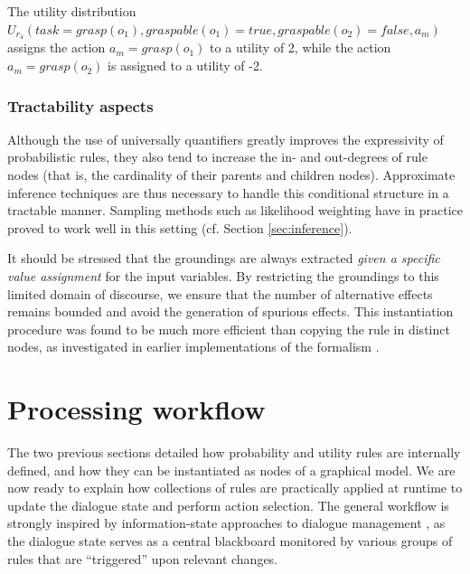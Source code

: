 The utility distribution $U_{r_4}(\mathit{task}\!=\!\mathit{grasp}(o_1), \mathit{graspable}(o_1) \!=\!\mathit{true}, \mathit{graspable}(o_2)\!=\!\mathit{false}, a_m)$ assigns the action $a_m\!=\!\mathit{grasp}(o_1)$ to a utility of 2, while the action $a_m\!=\!\mathit{grasp(o_2)}$ is assigned to a utility of -2. 

\subsubsection*{Tractability aspects}

Although the use of universally quantifiers greatly improves the expressivity of probabilistic rules, they also tend to increase the in- and out-degrees of rule nodes (that is, the cardinality of their parents and children nodes). Approximate inference techniques are thus necessary to handle this conditional structure in a tractable manner. Sampling methods such as likelihood weighting have in practice proved to work well in this setting (cf. Section \ref{sec:inference}).

It should be stressed that the groundings are always extracted \textit{given a specific value assignment} for the input variables. By restricting the groundings to this limited domain of discourse, we ensure that the number of alternative effects remains bounded and avoid the generation of spurious effects.   This instantiation procedure was found to be much more efficient than copying the rule in distinct nodes, as investigated in earlier implementations of the formalism \citep{relational-apl2012}.  




\section{Processing workflow}
\label{sec:processing-workflow}

The two previous sections detailed how probability and utility rules are internally defined, and how they can be instantiated as nodes of a graphical model. We are now ready to explain how collections of rules are practically applied at runtime to update the dialogue state and perform action selection. The general workflow is strongly inspired by information-state approaches to dialogue management \citep{Larsson:2000:ISD:973935.973943,Buckley:2006}, as the dialogue state serves as a central blackboard monitored by various groups of rules that are ``triggered'' upon relevant changes. 

